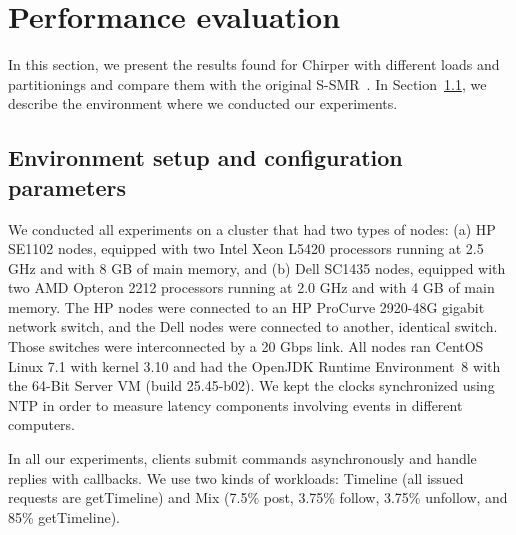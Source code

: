 \section{Performance evaluation}
\label{sec:experiments}


In this section, we present the results found for Chirper with different loads and partitionings and compare them with the original S-SMR~\cite{bezerra2014ssmr}.
In Section~\ref{sec:evaluation:setup}, we describe the environment where we conducted our experiments.

\subsection{Environment setup and configuration parameters}
\label{sec:evaluation:setup}

We conducted all experiments on a cluster that had two types of nodes: (a) HP SE1102 nodes, equipped with two Intel Xeon L5420 processors running at 2.5 GHz and with 8 GB of main memory, and (b) Dell SC1435 nodes, equipped with two AMD Opteron 2212 processors running at 2.0 GHz and with 4 GB of main memory. The HP nodes were connected to an HP ProCurve 2920-48G gigabit network switch, and the Dell nodes were connected to another, identical switch. Those switches were interconnected by a 20 Gbps link.
All nodes ran CentOS Linux 7.1 with kernel 3.10 and had the OpenJDK Runtime Environment~8 with the \mbox{64-Bit} Server VM (build 25.45-b02).
We kept the clocks synchronized using NTP in order to measure latency components involving events in different computers.

In all our experiments, clients submit commands asynchronously and handle replies with callbacks.
We use two kinds of workloads: Timeline (all issued requests are getTimeline) and Mix (7.5\% post, 3.75\% follow, 3.75\% unfollow, and 85\% getTimeline).